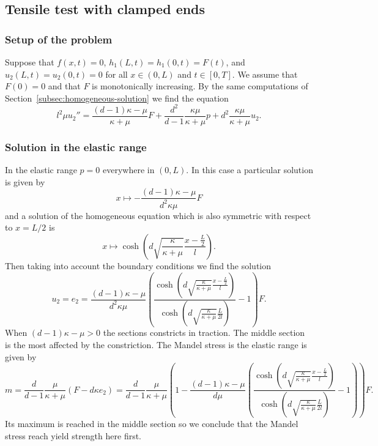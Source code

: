 \documentclass[a4paper,10pt,twoside]{amsbook}
\numberwithin{section}{chapter}
\numberwithin{equation}{chapter}
\theoremstyle{definition}
\begin{document}
\subsection{Tensile test with clamped ends}

\subsubsection*{Setup of the problem}

Suppose that $f(x,t)=0$, $h_1(L,t)=h_1(0,t)=F(t)$, and $u_2(L,t)=u_2(0,t)=0$ for all $x\in(0,L)$ and $t\in[0,T]$. We assume that $F(0)=0$ and that $F$ is monotonically increasing. By the same computations of Section~\ref{subsec:homogeneous-solution} we find the equation
\begin{equation}
\label{eqn:ode-u2}
l^2\mu u_2''=\frac{(d-1)\kappa-\mu}{\kappa+\mu}F+\frac{d^2}{d-1}\frac{\kappa\mu}{\kappa+\mu}p+d^2\frac{\kappa\mu}{\kappa+\mu}u_2.
\end{equation}

\subsubsection*{Solution in the elastic range}

In the elastic range $p=0$ everywhere in $(0,L)$. In this case a particular solution is given by
\[
x\mapsto-\frac{(d-1)\kappa-\mu}{d^2\kappa\mu}F
\]
and a solution of the homogeneous equation which is also symmetric with respect to $x=L/2$ is
\[
x\mapsto\cosh\left(d\sqrt{\frac{\kappa}{\kappa+\mu}}\frac{x-\frac{L}{2}}{l}\right).
\]
Then taking into account the boundary conditions we find the solution
\begin{equation}
\label{eqn:elastic-solution}
u_2=e_2=\frac{(d-1)\kappa-\mu}{d^2\kappa\mu}\left(\frac{\cosh\left(d\sqrt{\frac{\kappa}{\kappa+\mu}}\frac{x-\frac{L}{2}}{l}\right)}{\cosh\left(d\sqrt{\frac{\kappa}{\kappa+\mu}}\frac{L}{2l}\right)}-1\right)F.
\end{equation}
When $(d-1)\kappa-\mu>0$ the sections constricts in traction. The middle section is the most affected by the constriction. The Mandel stress is the elastic range is given by
\[
m=\frac{d}{d-1}\frac{\mu}{\kappa+\mu}(F-d\kappa e_2)=\frac{d}{d-1}\frac{\mu}{\kappa+\mu}\left(1-\frac{(d-1)\kappa-\mu}{d\mu}\left(\frac{\cosh\left(d\sqrt{\frac{\kappa}{\kappa+\mu}}\frac{x-\frac{L}{2}}{l}\right)}{\cosh\left(d\sqrt{\frac{\kappa}{\kappa+\mu}}\frac{L}{2l}\right)}-1\right)\right)F.
\]
Its maximum is reached in the middle section so we conclude that the Mandel stress reach yield strength here first.
\end{document}
